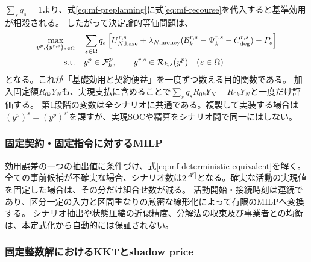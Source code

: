 $\sum_s q_s=1$より、式\eqref{eq:mf-preplanning}に式\eqref{eq:mf-recourse}を代入すると基準効用が相殺される。
したがって決定論的等価問題は、
\begin{align}
 \max_{y^p,\{y^{r,s}\}_{s\in\Omega}}\quad
 &\sum_{s\in\Omega}q_s\left[
 U_{N,\mathrm{base}}^{r,s}
 +\lambda_{N,\mathrm{money}}
 (\mathcal B_k^{r,s}-\Psi_k^{r,s}-C_{\mathrm{deg}}^{r,s})-P_s\right]\notag\\
 \mathrm{s.t.}\quad
 &y^p\in\mathcal F_k^p,\qquad
 y^{r,s}\in\mathcal R_{k,s}(y^p)\quad(s\in\Omega)
 \label{eq:mf-deterministic-equivalent}
\end{align}
となる。これが「基礎効用と契約便益」を一度ずつ数える目的関数である。
加入固定額$R_{0k}Y_N$も、実現支払に含めることで$\sum_s q_sR_{0k}Y_N=R_{0k}Y_N$と一度だけ評価する。
第1段階の変数は全シナリオに共通である。複製して実装する場合は$(y^p)^s=(y^p)^{s'}$を課すが、実現SOCや精算をシナリオ間で同一にはしない。

\subsubsection{固定契約・固定指令に対するMILP}

効用誤差の一つの抽出値に条件づけ、式\eqref{eq:mf-deterministic-equivalent}を解く。
全ての事前候補が不確実な場合、シナリオ数は$2^{|A^p|}$となる。確実な活動の実現値を固定した場合は、その分だけ組合せ数が減る。
活動開始・接続時刻は連続であり、区分一定の入力と区間重なりの厳密な線形化によって有限のMILPへ変換する。
シナリオ抽出や状態圧縮の近似精度、分解法の収束及び事業者との均衡は、本定式化から自動的には保証されない。

\subsubsection{固定整数解におけるKKTとshadow price}

